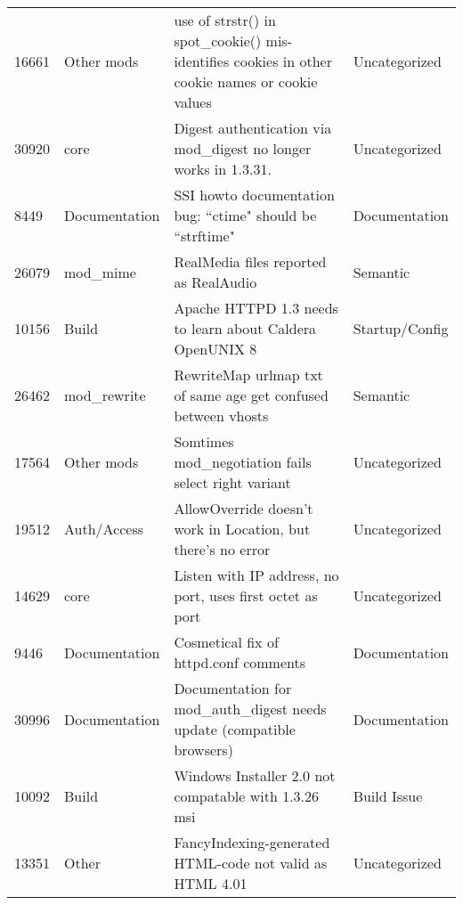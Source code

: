 \begin{longtable}[c]{llll}
16661  & Other mods         & use of strstr() in spot\_cookie() mis-identifies cookies in other cookie names or cookie values                & Uncategorized     \\
30920  & core               & Digest authentication via mod\_digest no longer works in 1.3.31.                                               & Uncategorized     \\
8449   & Documentation      & SSI howto documentation bug: ``ctime" should be ``strftime"                                                      & Documentation     \\
26079  & mod\_mime          & RealMedia files reported as RealAudio                                                                          & Semantic          \\
10156  & Build              & Apache HTTPD 1.3 needs to learn about Caldera OpenUNIX 8                                                       & Startup/Config    \\
26462  & mod\_rewrite       & RewriteMap urlmap txt of same age get confused between vhosts                                                  & Semantic          \\
17564  & Other mods         & Somtimes mod\_negotiation fails  select right variant                                                          & Uncategorized     \\
19512  & Auth/Access        & AllowOverride doesn't work in Location, but there's no error                              & Uncategorized     \\
14629  & core               & Listen with IP address, no port, uses first octet as port                                                      & Uncategorized     \\
9446   & Documentation      & Cosmetical fix of httpd.conf comments                                                                          & Documentation     \\
30996  & Documentation      & Documentation for mod\_auth\_digest needs update (compatible browsers)                                         & Documentation     \\
10092  & Build              & Windows Installer 2.0 not compatable with 1.3.26 msi                                                           & Build Issue       \\
13351  & Other              & FancyIndexing-generated HTML-code not valid as HTML 4.01                                                       & Uncategorized     \\

\end{longtable}
